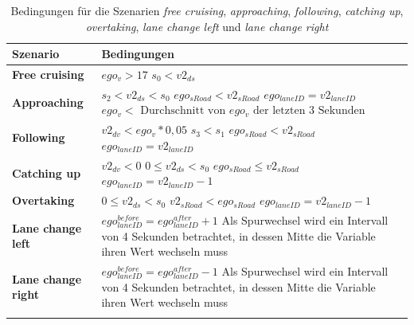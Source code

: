 \begin{longtable}[c]{p{3.8cm} p{10cm}}
\textbf{Szenario} & \textbf{Bedingungen} \\
\hline
\endhead

\textbf{Free cruising} & $ego_v > 17$ \newline $s_0 < v2_{ds}$ \\
\hline
\textbf{Approaching} & $s_2 < v2_{ds} < s_0$ \newline $ego_{sRoad} < v2_{sRoad}$ \newline $ego_{laneID} = v2_{laneID}$ \newline $ego_v < \text{ Durchschnitt von } ego_v \text{ der letzten 3 Sekunden} $ \\
\hline
\textbf{Following} & $v2_{dv} < ego_v * 0,05$ \newline $s_3 < s_1$ \newline $ego_{sRoad} < v2_{sRoad}$ \newline $ego_{laneID} = v2_{laneID}$ \\
\hline
\textbf{Catching up} & $v2_{dv} < 0$ \newline $0 \leq v2_{ds} < s_0$ \newline $ego_{sRoad} \leq v2_{sRoad}$ \newline $ego_{laneID} = v2_{laneID} - 1$ \\
\hline
\textbf{Overtaking} & $0 \leq v2_{ds} < s_0$ \newline $v2_{sRoad} < ego_{sRoad}$ \newline $ego_{laneID} = v2_{laneID} - 1$ \\
\hline
\textbf{Lane change left} & $ego_{laneID}^{before} = ego_{laneID}^{after} + 1$ \newline Als Spurwechsel wird ein Intervall von 4 Sekunden betrachtet, in dessen Mitte die Variable ihren Wert wechseln muss\\
\hline
\textbf{Lane change right} & $ego_{laneID}^{before} = ego_{laneID}^{after} - 1$ \newline Als Spurwechsel wird ein Intervall von 4 Sekunden betrachtet, in dessen Mitte die Variable ihren Wert wechseln muss \\

\hline
\caption{Bedingungen für die Szenarien \textit{free cruising}, \textit{approaching}, \textit{following}, \textit{catching up}, \textit{overtaking}, \textit{lane change left} und \textit{lane change right}}
\label{tab_szenarien_labeling}
\end{longtable}

